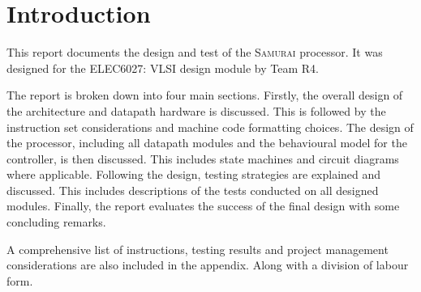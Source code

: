 

\chapter{Introduction}


This report documents the design and test of the \textsc{Samurai} processor. 
It was designed for the ELEC6027: VLSI design module by Team R4.

The report is broken down into four main sections.
Firstly, the overall design of the architecture and datapath hardware is discussed. 
This is followed by the instruction set considerations and machine code formatting choices. 
The design of the processor, including all datapath modules and the behavioural model for the controller, is then discussed.
This includes state machines and circuit diagrams where applicable. 
Following the design, testing strategies are explained and discussed. 
This includes descriptions of the tests conducted on all designed modules. 
Finally, the report evaluates the success of the final design with some concluding remarks. 

A comprehensive list of instructions, testing results and project management considerations are also included in the appendix.
Along with a division of labour form. 
